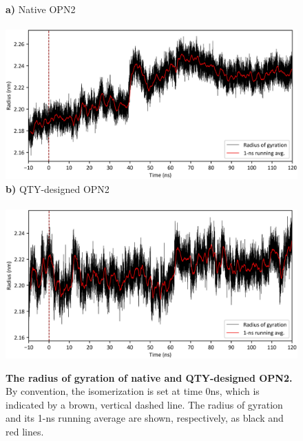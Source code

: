 \documentclass[fleqn,12pt]{supp}
\begin{document}
\begin{figure}[H]
    \caption{\textbf{The radius of gyration of native and QTY-designed OPN2. } By convention, the isomerization is set at time 0ns, which is indicated by a brown, vertical dashed line. The radius of gyration and its 1-ns running average are shown, respectively, as black and red lines. }
    \textbf{a)} Native OPN2 \\ \\
    \includegraphics[width=\linewidth]{FigureS3a.jpg}
    \textbf{b)} QTY-designed OPN2 \\ \\
    \includegraphics[width=\linewidth]{FigureS3b.jpg}
\end{figure}
\end{document}

